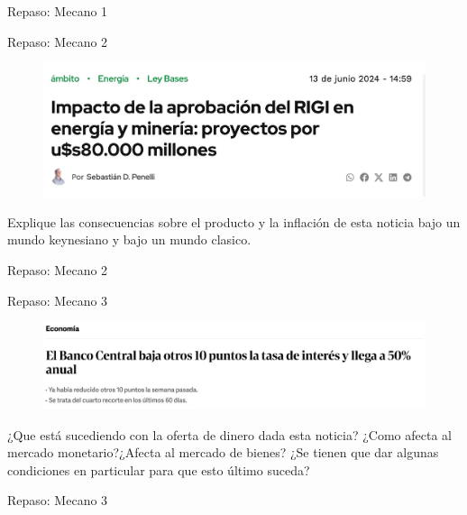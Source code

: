 \documentclass{beamer}
\begin{document}
\begin{frame}{Repaso: Mecano 1}
    
\end{frame}

\begin{frame}{Repaso: Mecano 2}

    \begin{figure}[h!]
        \centering
        \includegraphics[width=1\textwidth]{../Figures/ejercicio_noticia2.jpg}
    \end{figure}
    Explique las consecuencias sobre el producto y la inflación de esta noticia bajo un mundo keynesiano y bajo un mundo clasico.
\end{frame}

\begin{frame}{Repaso: Mecano 2}
    
\end{frame}

\begin{frame}{Repaso: Mecano 3}

    \begin{figure}[h!]
        \centering
        \includegraphics[width=1\textwidth]{../Figures/ejercicio_noticia3.jpg}
    \end{figure}
    ¿Que está sucediendo con la oferta de dinero dada esta noticia? ¿Como afecta al mercado monetario?¿Afecta al mercado de bienes? ¿Se tienen que dar algunas condiciones en particular para que esto último suceda?
\end{frame}

\begin{frame}{Repaso: Mecano 3}
    
\end{frame}
\end{document}
